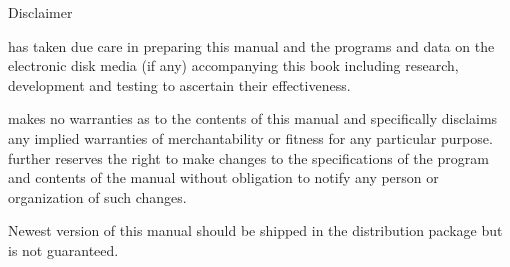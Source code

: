 \begin{center}
Disclaimer
\end{center}
\lextm has taken due care in preparing this manual and the programs and data on the electronic disk media (if any) accompanying this
book including research, development and testing to ascertain their effectiveness.

\lextm makes no warranties as to the contents of this manual and specifically disclaims any implied warranties of merchantability or fitness
for any particular purpose. \lextm further reserves the right to make changes to the specifications of the program and contents of
the manual without obligation to notify any person or organization of such changes.

Newest version of this manual should be shipped in the distribution package but is not guaranteed.

